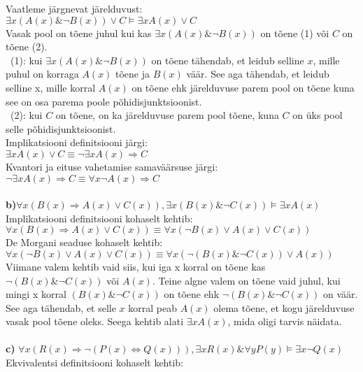 \documentclass{article}
\begin{document}
Vaatleme j\"argnevat j\"arelduvust:\\
$\exists x(A(x)\& \neg B(x))\vee C\models\exists x A(x)\vee C$\\
Vasak pool on t\~oene juhul kui kas $\exists x(A(x)\& \neg B(x))$ on t\~oene (1) v\~oi $C$ on t\~oene (2).\\
\null\ (1): kui $\exists x(A(x)\& \neg B(x))$ on t\~oene t\"ahendab, et leidub selline $x$, mille puhul on korraga $A(x)$ t\~oene ja $B(x)$ v\"a\"ar. See aga t\"ahendab, et leidub selline x, mille korral $A(x)$ on t\~oene ehk j\"arelduvuse parem pool on t\~oene kuna see on osa parema poole p\~ohidisjunktsioonist.\\
\null\ (2): kui $C$ on t\~oene, on ka j\"arelduvuse parem pool t\~oene, kuna $C$ on \"uks pool selle p\~ohidisjunktsioonist.\\
Implikatsiooni definitsiooni j\"argi:\\
$\exists x A(x)\vee C\equiv \neg\exists x A(x)\Rightarrow C$\\
Kvantori ja eituse vahetamise samav\"a\"arsuse j\"argi:\\
$\neg\exists x A(x)\Rightarrow C\equiv \forall x\neg A(x)\Rightarrow C$\\\\
\textbf{b)}$\forall x(B(x)\Rightarrow A(x)\vee C(x)), \exists x(B(x)\&\neg C(x))\models \exists x A(x)$\\
Implikatsiooni definitsiooni kohaselt kehtib:\\
$\forall x(B(x)\Rightarrow A(x)\vee C(x))\equiv\forall x(\neg B(x)\vee A(x)\vee C(x))$\\
De Morgani seaduse kohaselt kehtib:\\
$\forall x(\neg B(x)\vee A(x)\vee C(x))\equiv\forall x(\neg (B(x)\&\neg C(x))\vee A(x))$\\
Viimane valem kehtib vaid siis, kui iga x korral on t\~oene kas $\neg (B(x)\&\neg C(x))$ v\~oi $A(x)$. Teine algne valem on t\~oene vaid juhul, kui mingi x korral $(B(x)\&\neg C(x))$ on t\~oene ehk $\neg (B(x)\&\neg C(x))$ on v\"a\"ar. See aga t\"ahendab, et selle $x$ korral peab $A(x)$ olema t\~oene, et kogu j\"arelduvuse vasak pool t\~oene oleks. Seega kehtib alati $\exists x A(x)$, mida oligi tarvis n\"aidata.\\\\
\textbf{c)} $\forall x(R(x)\Rightarrow \neg(P(x)\Leftrightarrow Q(x))),\exists xR(x)\&\forall yP(y)\models \exists x\neg Q(x)$\\
Ekvivalentsi definitsiooni kohaselt kehtib:\\ 
\end{document}
